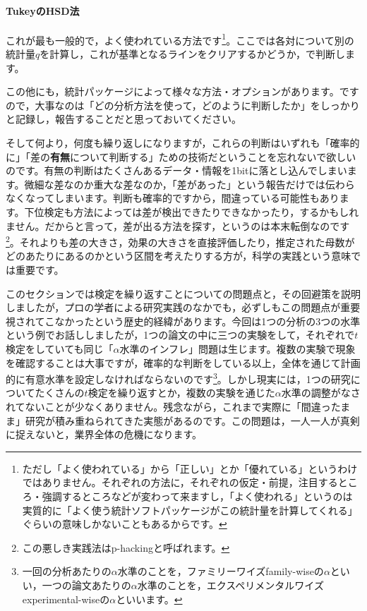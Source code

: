 \documentclass{ltjsarticle}
\begin{document}
\paragraph{TukeyのHSD法}これが最も一般的で，よく使われている方法です\footnote{ただし「よく使われている」から「正しい」とか「優れている」というわけではありません。それぞれの方法に，それぞれの仮定・前提，注目するところ・強調するところなどが変わって来ますし，「よく使われる」というのは実質的に「よく使う統計ソフトパッケージがこの統計量を計算してくれる」ぐらいの意味しかないこともあるからです。}。ここでは各対について別の統計量$q$を計算し，これが基準となるラインをクリアするかどうか，で判断します。

この他にも，統計パッケージによって様々な方法・オプションがあります。ですので，大事なのは「どの分析方法を使って，どのように判断したか」をしっかりと記録し，報告することだと思っておいてください。

そして何より，何度も繰り返しになりますが，これらの判断はいずれも「確率的に」「差の\textbf{有無}について判断する」ための技術だということを忘れないで欲しいのです。有無の判断はたくさんあるデータ・情報を1bitに落とし込んでしまいます。微細な差なのか重大な差なのか，「差があった」という報告だけでは伝わらなくなってしまいます。判断も確率的ですから，間違っている可能性もあります。下位検定も方法によっては差が検出できたりできなかったり，するかもしれません。だからと言って，差が出る方法を探す，というのは本末転倒なのです\footnote{この悪しき実践法はp-hackingと呼ばれます。}。それよりも差の大きさ，効果の大きさを直接評価したり，推定された母数がどのあたりにあるのかという区間を考えたりする方が，科学の実践という意味では重要です。

このセクションでは検定を繰り返すことについての問題点と，その回避策を説明しましたが，プロの学者による研究実践のなかでも，必ずしもこの問題点が重要視されてこなかったという歴史的経緯があります。今回は1つの分析の3つの水準という例でお話ししましたが，1つの論文の中に三つの実験をして，それぞれで$t$検定をしていても同じ「$\alpha$水準のインフレ」問題は生じます。複数の実験で現象を確認することは大事ですが，確率的な判断をしている以上，全体を通じて計画的に有意水準を設定しなければならないのです\footnote{一回の分析あたりの$\alpha$水準のことを，ファミリーワイズfamily-wiseの$\alpha$といい，一つの論文あたりの$\alpha$水準のことを，エクスペリメンタルワイズexperimental-wiseの$\alpha$といいます。}。しかし現実には，1つの研究についてたくさんの$t$検定を繰り返すとか，複数の実験を通じた$\alpha$水準の調整がなされてないことが少なくありません。残念ながら，これまで実際に「間違ったまま」研究が積み重ねられてきた実態があるのです。この問題は，一人一人が真剣に捉えないと，業界全体の危機になります。
\end{document}
